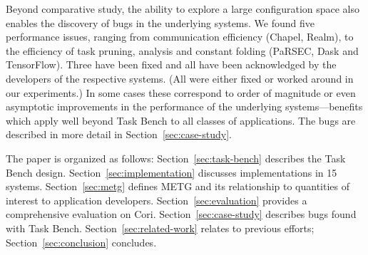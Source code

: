 

Beyond comparative study, the ability to explore a large configuration
space also enables the discovery of bugs in the underlying systems. We
found five performance issues, ranging from communication efficiency
(Chapel, Realm), to the efficiency of task pruning, analysis and
constant folding (PaRSEC, Dask and TensorFlow). Three have been fixed
and all have been acknowledged by the developers of the respective
systems. (All were either fixed or worked around in our experiments.)
In some cases these correspond to order of magnitude or even
asymptotic improvements in the performance of the underlying
systems---benefits which apply well beyond Task Bench to all classes
of applications. The bugs are described in more detail in Section~\ref{sec:case-study}.

The paper is organized as follows: Section~\ref{sec:task-bench}
describes the Task Bench design. Section~\ref{sec:implementation}
discusses implementations in 15 systems.  Section~\ref{sec:metg}
defines METG and its relationship to quantities of interest to
application developers.  Section~\ref{sec:evaluation} provides a
comprehensive evaluation on Cori. Section~\ref{sec:case-study} describes bugs found with Task Bench. Section~\ref{sec:related-work} relates to
previous efforts; Section~\ref{sec:conclusion} concludes.
